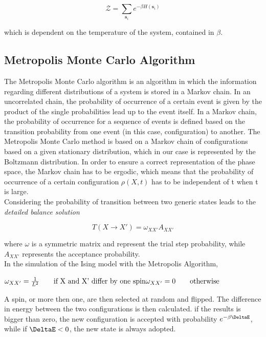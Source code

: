 \documentclass[twoside]{article}
\begin{document}
\begin{multicols}{2}
\begin{equation}
\mathcal{Z} = \sum_{\textbf{s}_i} e^{-\beta H\left(\textbf{s}_i\right)}
\end{equation}

which is dependent on the temperature of the system, contained in $\beta$.

\subsection{Metropolis Monte Carlo Algorithm}
The Metropolis Monte Carlo algorithm is an algorithm in which the information regarding different distributions of a system is stored in a Markov chain. 
In an uncorrelated chain, the probability of occurrence of a certain event is given by the product of the single probabilities lead up to the event itself. In a Markov chain, the probability of occurrence for a sequence of events is defined based on the transition probability from one event (in this case, configuration) to another.
The Metropolis Monte Carlo method is based on a Markov chain of configurations based on a given stationary distribution, which in our case is represented by the Boltzmann distribution. In order to ensure a correct representation of the phase space, the Markov chain has to be ergodic, which means that the probability of occurrence of a certain configuration $\rho(X, t)$ has to be independent of t when t is large. \\
Considering the probability of transition between two generic states leads to the \emph{detailed balance solution}

\begin{equation}
T(X \rightarrow X') = \omega_{XX'}A_{XX'}
\end{equation}

where \textbf{$\omega$} is a symmetric matrix and represent the trial step probability, while $A_{XX'}$ represents the acceptance probability. \\
In the simulation of the Ising model with the Metropolis Algorithm, 

\begin{center}$
\omega_{XX'} = \frac{1}{L^2} \qquad \text{if X and X' differ by one spin} \\
\omega_{XX'} = 0 \qquad  \text{otherwise} $
\end{center}

A spin, or more then one, are then selected at random and flipped. The difference in energy between the two configurations is then calculated. if the results is bigger than zero, the new configuration is accepted with probability $e^{-\beta\DeltaE}$, while if $\DeltaE < 0$, the new state is always adopted.


\end{multicols}
\end{document}
